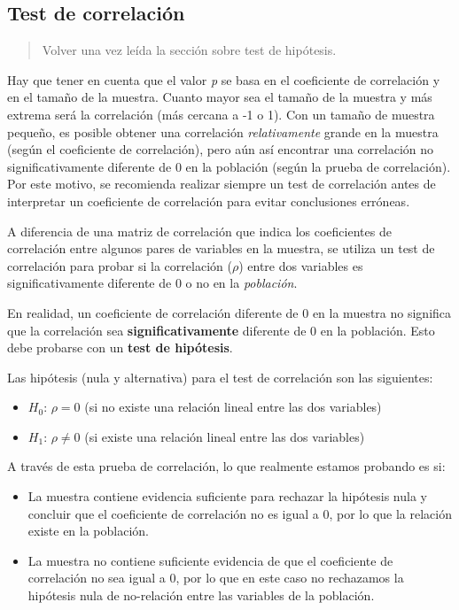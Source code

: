 \documentclass[
]{book}
\providecommand{\tightlist}{%
  \setlength{\itemsep}{0pt}\setlength{\parskip}{0pt}}
\begin{document}
\hypertarget{test-de-correlaciuxf3n}{%
\subsection{Test de correlación}\label{test-de-correlaciuxf3n}}

\begin{quote}
Volver una vez leída la sección sobre test de hipótesis.
\end{quote}

Hay que tener en cuenta que el valor \emph{p} se basa en el coeficiente de correlación y en el tamaño de la muestra. Cuanto mayor sea el tamaño de la muestra y más extrema será la correlación (más cercana a -1 o 1). Con un tamaño de muestra pequeño, es posible obtener una correlación \emph{relativamente} grande en la muestra (según el coeficiente de correlación), pero aún así encontrar una correlación no significativamente diferente de 0 en la población (según la prueba de correlación). Por este motivo, se recomienda realizar siempre un test de correlación antes de interpretar un coeficiente de correlación para evitar conclusiones erróneas.

A diferencia de una matriz de correlación que indica los coeficientes de correlación entre algunos pares de variables en la muestra, se utiliza un test de correlación para probar si la correlación (\(\rho\)) entre dos variables es significativamente diferente de 0 o no en la \emph{población}.

En realidad, un coeficiente de correlación diferente de 0 en la muestra no significa que la correlación sea \textbf{significativamente} diferente de 0 en la población. Esto debe probarse con un \textbf{test de hipótesis}.

Las hipótesis (nula y alternativa) para el test de correlación son las siguientes:

\begin{itemize}
\tightlist
\item
  \(H_0\): \(\rho = 0\) (si no existe una relación lineal entre las dos variables)
\item
  \(H_1\): \(\rho\ne 0\) (si existe una relación lineal entre las dos variables)
\end{itemize}

A través de esta prueba de correlación, lo que realmente estamos probando es si:

\begin{itemize}
\tightlist
\item
  La muestra contiene evidencia suficiente para rechazar la hipótesis nula y concluir que el coeficiente de correlación no es igual a 0, por lo que la relación existe en la población.
\item
  La muestra no contiene suficiente evidencia de que el coeficiente de correlación no sea igual a 0, por lo que en este caso no rechazamos la hipótesis nula de no-relación entre las variables de la población.
\end{itemize}
\end{document}
